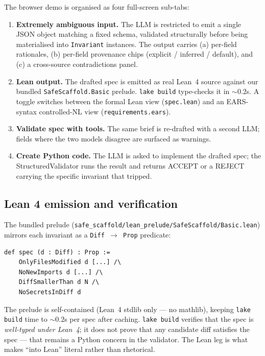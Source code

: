 \documentclass{article}
\begin{document}
The browser demo is organised as four full-screen sub-tabs:

\begin{enumerate}
\item \textbf{Extremely ambiguous input.} The LLM is restricted to emit a single JSON object matching a fixed schema, validated structurally before being materialised into \texttt{Invariant} instances. The output carries (a) per-field rationales, (b) per-field provenance chips (explicit / inferred / default), and (c) a cross-source contradictions panel.
\item \textbf{Lean output.} The drafted spec is emitted as real Lean~4 source against our bundled \texttt{SafeScaffold.Basic} prelude. \texttt{lake build} type-checks it in $\sim 0.2$s. A toggle switches between the formal Lean view (\texttt{spec.lean}) and an EARS-syntax controlled-NL view (\texttt{requirements.ears}).
\item \textbf{Validate spec with tools.} The same brief is re-drafted with a second LLM; fields where the two models disagree are surfaced as warnings.
\item \textbf{Create Python code.} The LLM is asked to implement the drafted spec; the StructuredValidator runs the result and returns ACCEPT or a REJECT carrying the specific invariant that tripped.
\end{enumerate}

\subsection{Lean 4 emission and verification}\label{sec:lean}

The bundled prelude (\texttt{safe\_scaffold/lean\_prelude/SafeScaffold/Basic.lean}) mirrors each invariant as a \texttt{Diff $\to$ Prop} predicate:

\begin{lstlisting}[language={}]
def spec (d : Diff) : Prop :=
    OnlyFilesModified d [...] /\
    NoNewImports d [...] /\
    DiffSmallerThan d N /\
    NoSecretsInDiff d
\end{lstlisting}

The prelude is self-contained (Lean~4 stdlib only --- no mathlib), keeping \texttt{lake build} time to $\sim 0.2$s per spec after caching. \texttt{lake build} verifies that the spec is \emph{well-typed under Lean~4}; it does not prove that any candidate diff satisfies the spec --- that remains a Python concern in the validator. The Lean leg is what makes ``into Lean'' literal rather than rhetorical.
\end{document}
